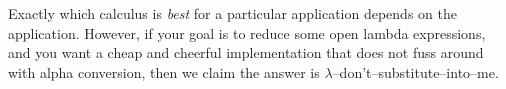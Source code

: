 Exactly which calculus is \emph{best} for a particular application depends on the application. However, if your goal is to reduce some open lambda expressions, and you want a cheap and cheerful implementation that does not fuss around with alpha conversion, then we claim the answer is $\lambda$--don't--substitute--into--me.


